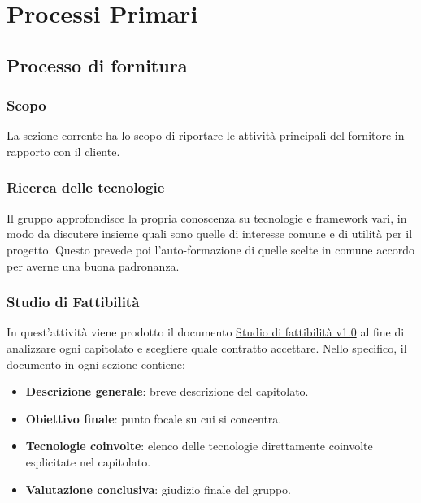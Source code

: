 \section{Processi Primari}\label{PP}

    \subsection{Processo di fornitura}\label{PP:Fornitura}	%

        \subsubsection{Scopo}\label{PP:Fornitura:Scopo}
		La sezione corrente ha lo scopo di riportare le  attività principali del fornitore in rapporto con il cliente. 
		
		\subsubsection{Ricerca delle tecnologie}
		Il gruppo approfondisce la propria conoscenza su tecnologie e framework vari, in modo da discutere insieme quali sono quelle di interesse comune e di utilità per il progetto. Questo prevede poi l'auto-formazione di quelle scelte in comune accordo per averne una buona padronanza.

        \subsubsection{Studio di Fattibilità}\label{PP:Fornitura:SdF} 
        In quest'attività viene prodotto il documento \underline{Studio di fattibilità v1.0} al fine di analizzare ogni capitolato e scegliere quale contratto accettare. 
        Nello specifico, il documento in ogni sezione contiene:
        	\begin{itemize}
        		\item \textbf{Descrizione generale}: breve descrizione del capitolato.
        		\item \textbf{Obiettivo finale}: punto focale su cui si concentra.
        		\item \textbf{Tecnologie coinvolte}: elenco delle tecnologie direttamente coinvolte esplicitate nel capitolato.
        		\item \textbf{Valutazione conclusiva}: giudizio finale del gruppo.
        	\end{itemize}
        
